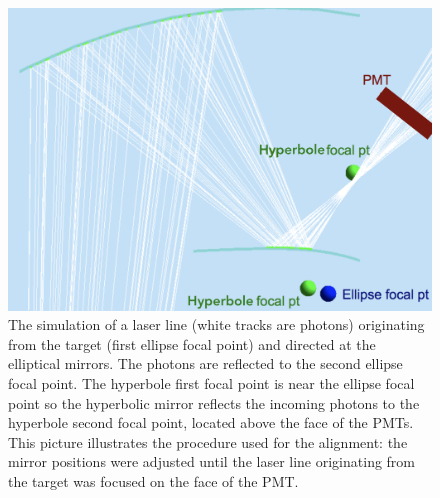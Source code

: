 \begin{figure}
\centering
	\includegraphics[width=0.99\columnwidth,  height=0.75\columnwidth]{img/mirrorAlignmentSimulationZoomed.png}
	\caption{The simulation of a laser line (white tracks are photons) originating from the target (first ellipse focal
          point) and directed at the elliptical mirrors. The photons are reflected to the second ellipse focal point. The
          hyperbole first focal point is near the ellipse focal point so the hyperbolic mirror reflects the incoming photons
          to the hyperbole second focal point, located above the face of the PMTs. This picture illustrates the procedure
          used for the alignment: the mirror positions were adjusted until the laser line originating from the target was
          focused on the face of the PMT.}
	\label{fig:alignmentSimulation}
\end{figure}

